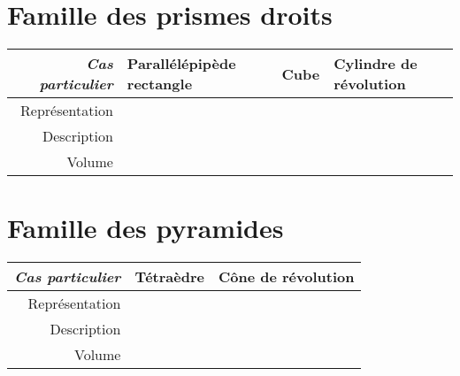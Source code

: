 \documentclass[12pt]{article}
\begin{document}
\section*{Famille des prismes droits}
\vfill
\newlength{\cellh}
\setlength{\cellh}{1.5cm}
\begin{tabularx}{\textwidth}{|r|X|X|X|}
  \hline
  \emph{Cas particulier} & Parallélépipède rectangle & Cube & Cylindre de révolution \\
  \hline
  Représentation & & & \\[\cellh]
  \hline
  Description & & & \\[\cellh]
  \hline
  Volume & & & \\[1cm]
  \hline
\end{tabularx}

\section*{Famille des pyramides}
\vfill
\setlength{\cellh}{1.5cm}
\begin{tabularx}{\textwidth}{|r|X|X|}
  \hline
  \emph{Cas particulier} & Tétraèdre & Cône de révolution \\
  \hline
  Représentation & & \\[\cellh]
  \hline
  Description & & \\[\cellh]
  \hline
  Volume & & \\[1cm]
  \hline

\end{tabularx}
\end{document}
